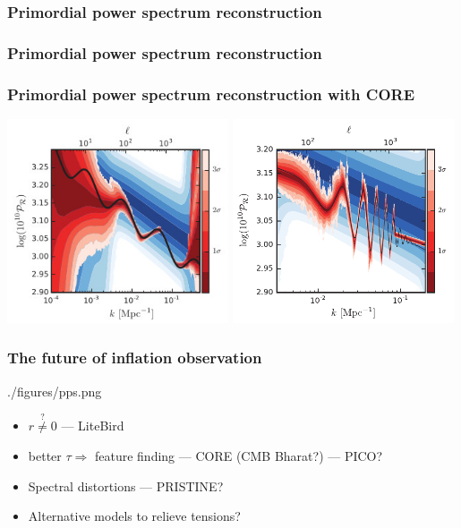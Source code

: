 \documentclass[%
]{beamer}
\begin{document}
\begin{frame}
    \frametitle{Primordial power spectrum reconstruction}
    \centering
    \begin{minipage}{0.7\textwidth}
        
    \end{minipage}
\end{frame}

\begin{frame}
    \frametitle{Primordial power spectrum reconstruction}
    \centering
    \begin{minipage}{0.7\textwidth}
        
    \end{minipage}
\end{frame}

\begin{frame}
    \frametitle{Primordial power spectrum reconstruction with CORE}
    \centering
    \includegraphics[width=0.49\textwidth]{./figures/posterior_monodromy_2.jpg}
    \includegraphics[width=0.49\textwidth]{./figures/posterior_cs_2.pdf}
\end{frame}

\begin{frame}
    \frametitle{The future of inflation observation}
    \centering
    \begin{figleft}[0.6]{./figures/pps.png}
        \begin{itemize}
            \item $r\stackrel{?}{\ne}0$ --- LiteBird
            \item better $\tau\Rightarrow$ feature finding --- CORE (CMB Bharat?) --- PICO?
            \item Spectral distortions --- PRISTINE?
            \item Alternative models to relieve tensions?
        \end{itemize}
    \end{figleft}
\end{frame}
\end{document}
